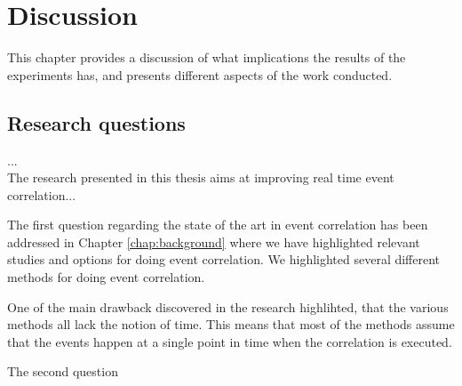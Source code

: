 \chapter{Discussion}
\label{chap:discussion}
This chapter provides a discussion of what implications the results of the experiments has, and presents different aspects of the work conducted.


\iffalse
graph the dataset and look at peaks.
Then multiply by potential hosts in enterprise.
Then look at, are we able to handle that amount of events?
What if we use more rules?


\textbf{Research questions:}
\begin{enumerate}
    \item What is the state of the art for real time event correlation?
    \item How can we improve the way real time event correlation is done for Windows Event Logs? %
    \item What is the performance of our proposed method, and how does it compare to other methods?
\end{enumerate}

\fi

\iffalse
Interpretations: what do the results mean?
Implications: why do the results matter?
Limitations: what can’t the results tell us?
Recommendations: what practical actions or scientific studies should follow?
\fi


\section{Research questions}
...\\
The research presented in this thesis aims at improving real time event correlation...


The first question regarding the state of the art in event correlation has been addressed in Chapter \cref{chap:background} where we have highlighted relevant studies and options for doing event correlation. We highlighted several different methods for doing event correlation.

One of the main drawback discovered in the research highlihted, that the various methods all lack the notion of time. This means that most of the methods assume that the events happen at a single point in time when the correlation is executed.

The second question 

